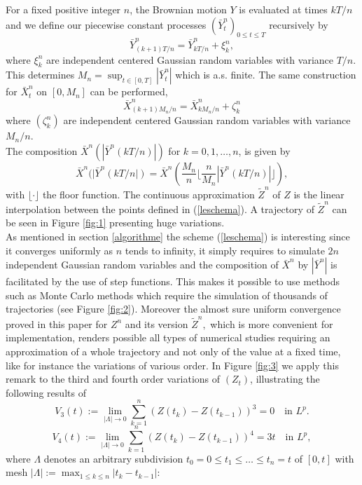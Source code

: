 \documentclass[a4paper, 11pt]{article}
\newcommand{\1}{\mathbf{1}}
\begin{document}
\noindent For a fixed positive integer $n$, the Brownian motion $Y$ is evaluated at times $kT/n$ and we define our piecewise constant processes $(\bar{Y}_t^n)_{0\leq t \leq T}$ recursively by
\begin{equation*}
\bar{Y}_{(k+1)T/n}^n=\bar{Y}_{kT/n}^n+\xi_k^n,
\end{equation*}
where $\xi_k^n$ are independent centered Gaussian random variables with variance $T/n$. This determines $M_n=\sup_{t\in [0,T]} |\bar{Y}_t^n|$ which is a.s. finite. The same construction for $\bar{X}_t^n$ on $[0,M_n]$ can be performed, 
$$\bar{X}_{(k+1)M_n/n}^n=\bar{X}_{kM_n/n}^n+\zeta_k^n$$
where $(\zeta_k^n)$ are independent centered Gaussian random variables with variance $M_n/n$.\\
The composition $\bar{X}^n(|\bar{Y}^n(kT/n)|)$ for $k=0,1,\ldots, n$, is given by
\begin{equation}\label{leschema}
\bar{X}^n(|\bar{Y}^n(kT/n|)=\bar{X}^n\left( \frac{M_n}{n} \Big \lfloor \frac{n}{M_n}|\bar{Y}^n(kT/n)|\Big \rfloor \right),
\end{equation}
with $\lfloor \cdot \rfloor$ the floor function. The continuous approximation $\tilde{Z}^n$ of $Z$ is the linear interpolation between the points defined in (\ref{leschema}). A trajectory of $\tilde{Z}^n$  can be seen in Figure \ref{fig:1} presenting huge variations.\\
As mentioned in section \ref{algorithme} the scheme (\ref{leschema}) is interesting since it converges uniformly as $n$ tends to infinity, it simply requires to simulate $2n$ independent Gaussian random variables and the composition of $\bar{X}^n$ by $|\bar{Y}^n|$ is facilitated by the use of step functions. This makes it possible to use methods such as Monte Carlo methods which require the simulation of thousands of trajectories (see Figure \ref{fig:2}). Moreover the almost sure uniform convergence proved in this paper for $Z^n$ and its version $\tilde{Z}^n,$  which is more convenient for implementation, renders possible all types of numerical studies requiring an approximation of a whole trajectory and not only of the value at a fixed time, like for instance the variations of various order. In Figure \ref{fig:3} we apply this remark to the third and fourth order variations of $(Z_t)$, illustrating the following results of \cite{burdzy3}
\begin{equation*}
V_3(t):=\lim_{|\Lambda|\rightarrow 0} \sum_{k=1}^n(Z(t_k)-Z(t_{k-1}))^3= 0 \quad \text{in\ } L^p.
\end{equation*}
\begin{equation*}
V_4(t):=\lim_{|\Lambda|\rightarrow 0} \sum_{k=1}^n(Z(t_k)-Z(t_{k-1}))^4= 3t \quad \text{in\ } L^p,
\end{equation*}
where $\Lambda$ denotes an arbitrary subdivision $t_0=0\leq t_1 \leq \ldots \leq t_n=t $ of $[0,t]$ with mesh $|\Lambda|:= \max_{1\leq k \leq n} |t_k-t_{k-1}|$:
\end{document}
